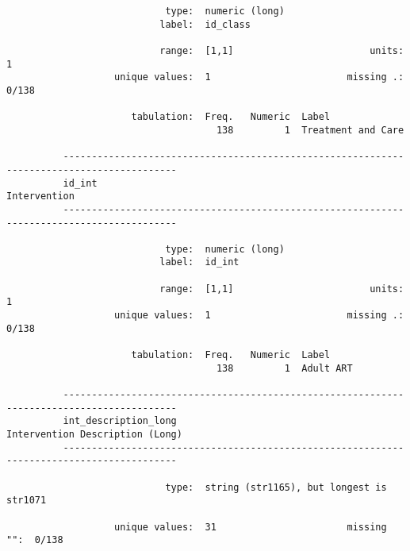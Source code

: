 \documentclass{article}
\begin{document}
\begin{verbatim}
                            type:  numeric (long)
                           label:  id_class
          
                           range:  [1,1]                        units:  1
                   unique values:  1                        missing .:  0/138
          
                      tabulation:  Freq.   Numeric  Label
                                     138         1  Treatment and Care
          
          ------------------------------------------------------------------------------------------
          id_int                                                                        Intervention
          ------------------------------------------------------------------------------------------
          
                            type:  numeric (long)
                           label:  id_int
          
                           range:  [1,1]                        units:  1
                   unique values:  1                        missing .:  0/138
          
                      tabulation:  Freq.   Numeric  Label
                                     138         1  Adult ART
          
          ------------------------------------------------------------------------------------------
          int_description_long                                       Intervention Description (Long)
          ------------------------------------------------------------------------------------------
          
                            type:  string (str1165), but longest is str1071
          
                   unique values:  31                       missing "":  0/138
          

\end{verbatim}
\end{document}
